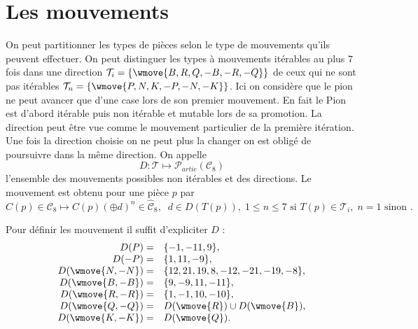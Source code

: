 \documentclass[11pt]{article}
\newcommand{\PP}{{\mathcal{P}}}
\newcommand{\TT}{{\mathcal{T}}}
\newcommand{\CC}{{\mathcal{C}}}
\begin{document}
\section{Les mouvements}
On peut partitionner les types de pièces selon le type de mouvements qu'ils peuvent effectuer. On peut distinguer les types à mouvements itérables au plus $7$ fois dans une direction $\TT_i=\{\wmove{B,R,Q,-B,-R,-Q}\}$ de ceux qui ne sont pas itérables $\TT_n=\{\wmove{P,N,K,-P,-N,-K}\}$. Ici on considère que le pion ne peut avancer que d'une case lors de son premier mouvement. En fait le Pion est d'abord itérable puis non itérable et mutable lors de sa promotion. La direction peut être vue comme le mouvement particulier de la première itération. Une fois la direction choisie on
ne peut plus la changer on est obligé de poursuivre dans la même direction.  On appelle $$D:\TT \mapsto \PP_{artie}(\CC_8)$$
 l'ensemble des mouvements possibles non itérables et des directions. Le mouvement est obtenu pour une pièce $p$ par
$$C(p)\in\CC_8 \mapsto C(p)(\oplus d) ^n\in\hat{\CC}_8, \;\;d \in D(T(p)), \;1\leq n\leq 7  \mbox{ si }T(p)\in \TT_i,\; n=1 \mbox{ sinon }.$$

Pour définir les mouvement il suffit d'expliciter $D$ :
$$\begin{array}{rl}
D(P)=& \{-1,-11,9\} ,\\
D(-P)=& \{1,11,-9\} ,\\
D(\wmove{N,-N})= &\{12, 21, 19, 8 ,-12, -21, -19, -8\} ,\\
D(\wmove{B,-B})= &\{9,-9,11,-11\}, \\
D(\wmove{R,-R})=&\{1,-1,10,-10\} ,\\
D(\wmove{Q,-Q})= &  D(\wmove{R})\cup D(\wmove{B}),\\
D(\wmove{K,-K})=& D(\wmove{Q}).
\end{array}$$
\end{document}
